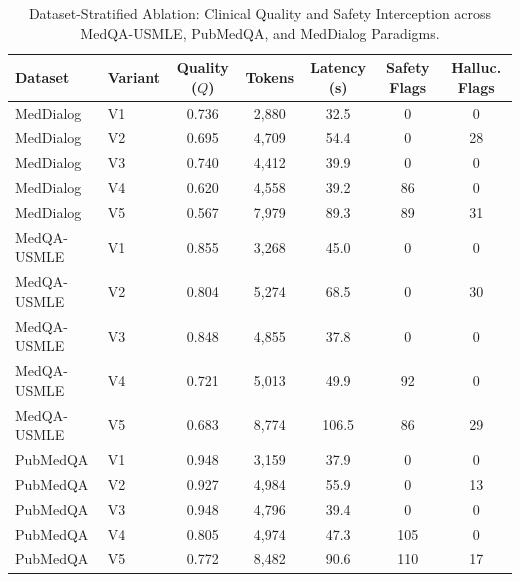 \begin{table}
\caption{Dataset-Stratified Ablation: Clinical Quality and Safety Interception across MedQA-USMLE, PubMedQA, and MedDialog Paradigms.}
\label{tab:dataset_ablation}
\begin{tabular}{llccccc}
\toprule
Dataset & Variant & Quality ($Q$) & Tokens & Latency (s) & Safety Flags & Halluc. Flags \\
\midrule
MedDialog & V1 & 0.736 & 2,880 & 32.5 & 0 & 0 \\
MedDialog & V2 & 0.695 & 4,709 & 54.4 & 0 & 28 \\
MedDialog & V3 & 0.740 & 4,412 & 39.9 & 0 & 0 \\
MedDialog & V4 & 0.620 & 4,558 & 39.2 & 86 & 0 \\
MedDialog & V5 & 0.567 & 7,979 & 89.3 & 89 & 31 \\
MedQA-USMLE & V1 & 0.855 & 3,268 & 45.0 & 0 & 0 \\
MedQA-USMLE & V2 & 0.804 & 5,274 & 68.5 & 0 & 30 \\
MedQA-USMLE & V3 & 0.848 & 4,855 & 37.8 & 0 & 0 \\
MedQA-USMLE & V4 & 0.721 & 5,013 & 49.9 & 92 & 0 \\
MedQA-USMLE & V5 & 0.683 & 8,774 & 106.5 & 86 & 29 \\
PubMedQA & V1 & 0.948 & 3,159 & 37.9 & 0 & 0 \\
PubMedQA & V2 & 0.927 & 4,984 & 55.9 & 0 & 13 \\
PubMedQA & V3 & 0.948 & 4,796 & 39.4 & 0 & 0 \\
PubMedQA & V4 & 0.805 & 4,974 & 47.3 & 105 & 0 \\
PubMedQA & V5 & 0.772 & 8,482 & 90.6 & 110 & 17 \\
\bottomrule
\end{tabular}
\end{table}
